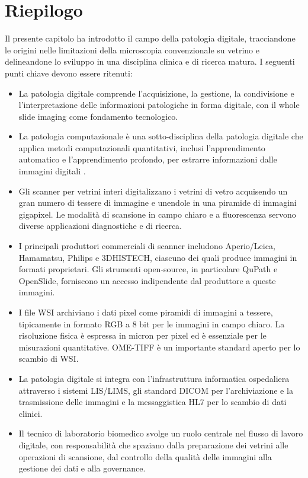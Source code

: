\section{Riepilogo}

Il presente capitolo ha introdotto il campo della patologia digitale, tracciandone le origini nelle limitazioni della microscopia convenzionale su vetrino e delineandone lo sviluppo in una disciplina clinica e di ricerca matura. I seguenti punti chiave devono essere ritenuti:

\begin{itemize}
  \item La patologia digitale comprende l'acquisizione, la gestione, la condivisione e l'interpretazione delle informazioni patologiche in forma digitale, con il whole slide imaging come fondamento tecnologico.
  \item La patologia computazionale è una sotto-disciplina della patologia digitale che applica metodi computazionali quantitativi, inclusi l'apprendimento automatico e l'apprendimento profondo, per estrarre informazioni dalle immagini digitali \cite{campanella2019,bera2019}.
  \item Gli scanner per vetrini interi digitalizzano i vetrini di vetro acquisendo un gran numero di tessere di immagine e unendole in una piramide di immagini gigapixel. Le modalità di scansione in campo chiaro e a fluorescenza servono diverse applicazioni diagnostiche e di ricerca.
  \item I principali produttori commerciali di scanner includono Aperio/Leica, Hamamatsu, Philips e 3DHISTECH, ciascuno dei quali produce immagini in formati proprietari. Gli strumenti open-source, in particolare QuPath \cite{bankhead2017} e OpenSlide, forniscono un accesso indipendente dal produttore a queste immagini.
  \item I file WSI archiviano i dati pixel come piramidi di immagini a tessere, tipicamente in formato RGB a 8 bit per le immagini in campo chiaro. La risoluzione fisica è espressa in micron per pixel ed è essenziale per le misurazioni quantitative. OME-TIFF è un importante standard aperto per lo scambio di WSI.
  \item La patologia digitale si integra con l'infrastruttura informatica ospedaliera attraverso i sistemi LIS/LIMS, gli standard DICOM per l'archiviazione e la trasmissione delle immagini e la messaggistica HL7 per lo scambio di dati clinici.
  \item Il tecnico di laboratorio biomedico svolge un ruolo centrale nel flusso di lavoro digitale, con responsabilità che spaziano dalla preparazione dei vetrini alle operazioni di scansione, dal controllo della qualità delle immagini alla gestione dei dati e alla governance.
\end{itemize}

